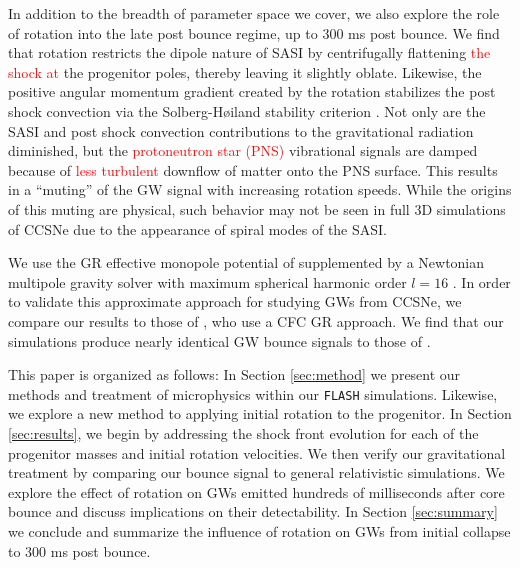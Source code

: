 \documentclass[twocolumn,times]{aastex62}  %
\begin{document}


In addition to the breadth of parameter space we cover, we also explore the role of rotation into the late post bounce regime, up to 300 ms post bounce.  
We find that rotation restricts the dipole nature of SASI by centrifugally flattening \textcolor{red}{the shock at} the progenitor poles, thereby leaving it slightly oblate. Likewise, the positive angular momentum gradient created by the rotation stabilizes the post shock convection via the Solberg-H{\o}iland stability criterion \citep{endal:1978,fryer:2000}.  Not only are the SASI and post shock convection contributions to the gravitational radiation diminished, but the \textcolor{red}{protoneutron star (PNS)} vibrational signals are damped because of \textcolor{red}{less turbulent} downflow of matter onto the PNS surface.  
This results in a ``muting'' of the GW signal with increasing rotation speeds.
While the origins of this muting are physical, such behavior may not be seen in full 3D simulations of CCSNe due to the appearance of spiral modes of the SASI. 

We use the GR effective monopole potential of \citet{marek:2006} supplemented by a Newtonian multipole gravity solver with maximum spherical harmonic order $l=16$ \citep{couch:2013a, oconnor:2018}.
In order to validate this approximate approach for studying GWs from CCSNe, we compare our results to those of \citet{richers:2017}, who use a CFC GR approach.  We find that our simulations produce nearly identical GW bounce signals to those of \citet{richers:2017}.  

This paper is organized as follows:  In Section \ref{sec:method} we present our methods and treatment of microphysics within our \texttt{FLASH} simulations.  Likewise, we explore a new method to applying initial rotation to the progenitor.  In Section \ref{sec:results}, we begin by addressing the shock front evolution for each of the progenitor masses and initial rotation velocities.  We then verify our gravitational treatment by comparing our bounce signal to general relativistic simulations.  We explore the effect of rotation on GWs emitted hundreds of milliseconds after core bounce and discuss implications on their detectability.  In Section \ref{sec:summary} we conclude and summarize the influence of rotation on GWs from initial collapse to 300 ms post bounce. 
\end{document}
